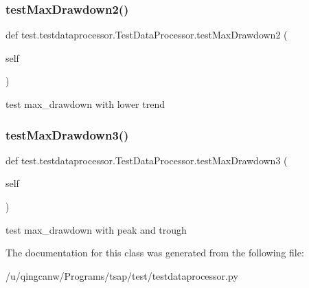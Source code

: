 \subsubsection{\texorpdfstring{test\+Max\+Drawdown2()}{testMaxDrawdown2()}}
{\footnotesize\ttfamily def test.\+testdataprocessor.\+Test\+Data\+Processor.\+test\+Max\+Drawdown2 (\begin{DoxyParamCaption}\item[{}]{self }\end{DoxyParamCaption})}

\begin{DoxyVerb}test max_drawdown with lower trend\end{DoxyVerb}
 \mbox{\label{classtest_1_1testdataprocessor_1_1TestDataProcessor_a53255217d9105331fbd84eb51a7584e3}} 
\subsubsection{\texorpdfstring{test\+Max\+Drawdown3()}{testMaxDrawdown3()}}
{\footnotesize\ttfamily def test.\+testdataprocessor.\+Test\+Data\+Processor.\+test\+Max\+Drawdown3 (\begin{DoxyParamCaption}\item[{}]{self }\end{DoxyParamCaption})}

\begin{DoxyVerb}test max_drawdown with peak and trough\end{DoxyVerb}
 

The documentation for this class was generated from the following file\+:\begin{DoxyCompactItemize}
\item 
/u/qingcanw/\+Programs/tsap/test/testdataprocessor.\+py\end{DoxyCompactItemize}
